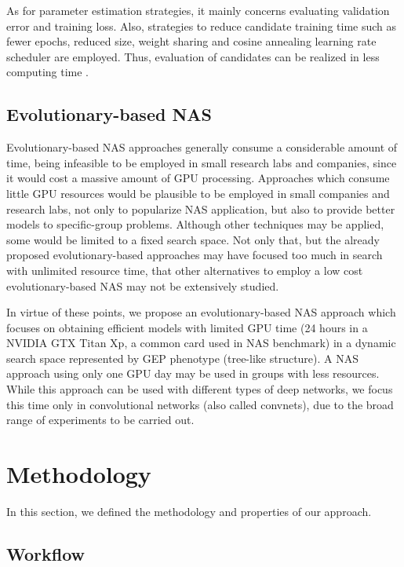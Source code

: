 \documentclass[conference]{IEEEtran}
\begin{document}
	As for parameter estimation strategies, it mainly concerns evaluating validation error and training loss.
	Also, strategies to reduce candidate training time such as fewer epochs, reduced size, weight sharing and cosine annealing learning rate scheduler are employed. 
	Thus, evaluation of candidates can be realized in less computing time \cite{elsken2018neural}. 
	
	\subsection{Evolutionary-based NAS}
	
	Evolutionary-based NAS approaches generally consume a considerable amount of time, being infeasible to be employed in small research labs and companies, since it would cost a massive amount of GPU processing.
	Approaches which consume little GPU resources would be plausible to be employed in small companies and research labs, not only to popularize NAS application, but also to provide better models to specific-group problems.
	Although other techniques may be applied, some would be limited to a fixed search space.
	Not only that, but the already proposed evolutionary-based approaches may have focused too much in search with unlimited resource time, that other alternatives to employ a low cost evolutionary-based NAS may not be extensively studied.
	
	In virtue of these points, we propose an evolutionary-based NAS approach which focuses on obtaining efficient models with limited GPU time (24 hours in a NVIDIA GTX Titan Xp, a common card used in NAS benchmark) in a dynamic search space represented by GEP phenotype (tree-like structure).
	A NAS approach using only one GPU day may be used in groups with less resources.
	While this approach can be used with different types of deep networks, we focus this time only in convolutional networks (also called convnets), due to the broad range of experiments to be carried out.
	
	\section{Methodology}
	
	In this section, we defined the methodology and properties of our approach.
	
	\subsection{Workflow}
	
\end{document}
